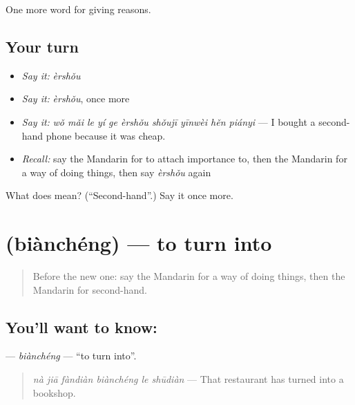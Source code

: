 \begin{grammarlens}[title={What you've built}]
One more word for giving reasons.
\end{grammarlens}

\subsection*{Your turn}
\begin{itemize}
\raggedright
  \item \emph{Say it:} \emph{èrshǒu}
  \item \emph{Say it:} \emph{èrshǒu}, once more
  \item \emph{Say it:} \emph{wǒ mǎi le yí ge èrshǒu shǒujī yīnwèi hěn piányi} — I bought a second-hand phone because it was cheap.
  \item \emph{Recall:} say the Mandarin for to attach importance to, then the Mandarin for a way of doing things, then say \emph{èrshǒu} again
\end{itemize}

\begin{tcolorbox}[breakable,colback=teal!4,colframe=teal!35!black,title={Before you move on}]
What does  mean? (\textquotedblleft{}Second-hand\textquotedblright{}.) Say it once more.
\end{tcolorbox}
\section[\texorpdfstring{\zh{变成} (biànchéng)}{变成 (biànchéng)}]{ (biànchéng) — to turn into}

\label{lesson:ZH-C386-biancheng}



\begin{quote}
Before the new one: say the Mandarin for a way of doing things, then the Mandarin for second-hand.
\end{quote}

\subsection*{You'll want to know: }
\textbf{} — \emph{biànchéng} — \textquotedblleft{}to turn into\textquotedblright{}.

\begin{quote}
\textbf{} \emph{nà jiā fàndiàn biànchéng le shūdiàn} — That restaurant has turned into a bookshop.
\end{quote}

